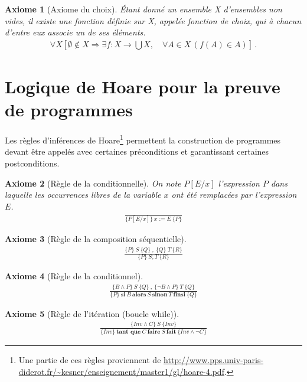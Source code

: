 \documentclass[10pt,a4paper]{article}
\newtheorem{axiom}{Axiome}[section]
\begin{document}
{\begin{axiom}[Axiome du choix] Étant donné un ensemble X d'ensembles non vides, il existe une fonction définie sur X, appelée fonction de choix, qui à chacun d'entre eux associe un de ses éléments.
\begin{align}
\forall X \left[ \emptyset \notin X \Rightarrow \exists f: X \rightarrow \bigcup X, \quad \forall A \in X \, ( f(A) \in A ) \right] \,. 
\end{align}
\end{axiom}

\section{Logique de Hoare pour la preuve de programmes}
\label{Hoare}

Les règles d'inférences de Hoare\footnote{Une partie de ces règles proviennent de \url{http://www.pps.univ-paris-diderot.fr/~kesner/enseignement/master1/gl/hoare-4.pdf}.} permettent la construction de programmes devant être appelés avec certaines préconditions et garantissant certaines postconditions.

\begin{axiom}[Règle de la conditionnelle]
On note $P[E/x]$ l'expression $P$ dans laquelle les occurrences libres de la variable $x$ ont été remplacées par l'expression $E$.
\begin{align}
\frac{}{\{P[E/x]\}\ x:=E \ \{P\} }
\end{align}
\end{axiom}

\begin{axiom}[Règle de la composition séquentielle]
\begin{align}
\frac {\{P\}\ S\ \{Q\}\ , \ \{Q\}\ T\ \{R\} } {\{P\}\ S;T\ \{R\}}
\end{align}
\end{axiom}

\begin{axiom}[Règle de la conditionnel]
\begin{align}
\frac { \{B \wedge P\}\ S\ \{Q\}\ ,\ \{\neg B \wedge P \}\ T\ \{Q\} } { \{P\}\ \textbf{si}\ B\ \textbf{alors}\ S\ \textbf{sinon}\ T\ \textbf{finsi}\ \{Q\} }
\end{align}
\end{axiom}

\begin{axiom}[Règle de l'itération (boucle while)]
\begin{align}
\frac { \{Inv \wedge C \}\ S\ \{Inv \} } { \{Inv \}\ \textbf{tant que}\ C\ \textbf{faire}\ S\ \textbf{fait}\ \{Inv \wedge \neg C \} }
\end{align}
\end{axiom}

}
\end{document}
